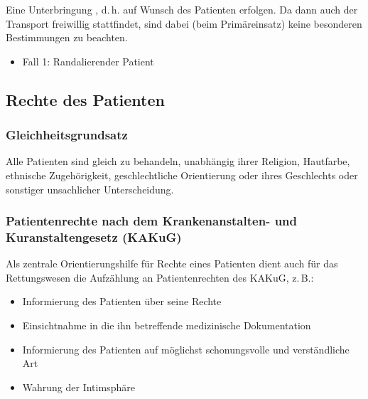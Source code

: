 {
Eine Unterbringung , d.\,h. auf
Wunsch des Patienten erfolgen. Da dann auch der Transport
freiwillig stattfindet, sind dabei (beim Primäreinsatz)
keine besonderen Bestimmungen zu beachten.
}
{}
{}
{}
{}

{
\begin{itemize}
  \item Fall 1: Randalierender Patient
  \dotfill{}
\end{itemize}
}
{}
{}
{}
{}


\subsection{Rechte des Patienten}

\label{topic:patientenrechte}

\subsubsection{Gleichheitsgrundsatz}

\Text
{{\TxBeschreibung}}%
{%
%
Alle Patienten sind gleich zu behandeln, unabhängig
ihrer Religion, Hautfarbe, ethnische Zugehörigkeit,
geschlechtliche Orientierung oder ihres Geschlechts oder
sonstiger unsachlicher Unterscheidung.

\subsubsection{Patientenrechte nach dem
Krankenanstalten- und Kuranstaltengesetz (KAKuG)}

Als zentrale Orientierungshilfe für Rechte eines Patienten
dient auch für das Rettungswesen die Aufzählung an
Patientenrechten des KAKuG,
z.\,B.:

\begin{itemize}
  \item Informierung des Patienten über seine Rechte
  \item Einsichtnahme in die ihn betreffende
  medizinische Dokumentation
  \item Informierung des Patienten auf möglichst
  schonungsvolle und verständliche Art
  \item Wahrung der Intimsphäre
\end{itemize}
}%




